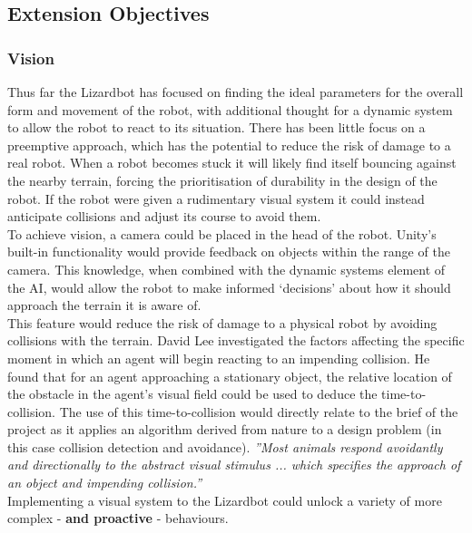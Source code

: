 \documentclass{article}
\begin{document}
\subsection{Extension Objectives}
\subsubsection{Vision}
Thus far the Lizardbot has focused on finding the ideal parameters for the overall form and movement of the robot, with additional thought for a dynamic system to allow the robot to react to its situation. There has been little focus on a preemptive approach, which has the potential to reduce the risk of damage to a real robot. When a robot becomes stuck it will likely find itself bouncing against the nearby terrain, forcing the prioritisation of durability in the design of the robot. If the robot were given a rudimentary visual system it could instead anticipate collisions and adjust its course to avoid them.\\
To achieve vision, a camera could be placed in the head of the robot. Unity’s built-in functionality would provide feedback on objects within the range of the camera. This knowledge, when combined with the dynamic systems element of the AI, would allow the robot to make informed ‘decisions’ about how it should approach the terrain it is aware of. \\
This feature would reduce the risk of damage to a physical robot by avoiding collisions with the terrain. David Lee investigated the factors affecting the specific moment in which an agent will begin reacting to an impending collision. He found that for an agent approaching a stationary object, the relative location of the obstacle in the agent’s visual field could be used to deduce the time-to-collision.  The use of this time-to-collision would directly relate to the brief of the project as it applies an algorithm derived from nature to a design problem (in this case collision detection and avoidance). \textit{”Most animals respond avoidantly and directionally to the abstract visual stimulus ... which specifies the approach of an object and impending collision.”} \\
Implementing a visual system to the Lizardbot could unlock a variety of more complex - \textbf{and proactive} - behaviours.

\newpage
\end{document}
